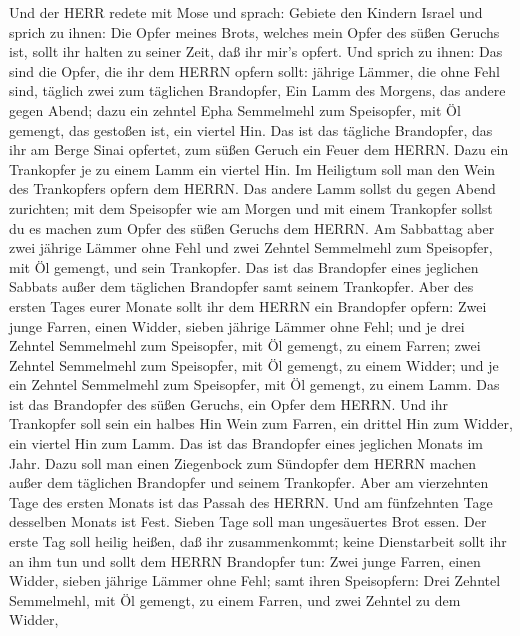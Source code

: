  Und der HERR redete mit Mose und sprach: 
Gebiete den Kindern Israel und sprich zu ihnen: Die Opfer meines Brots,
welches mein Opfer des süßen Geruchs ist, sollt ihr halten zu seiner
Zeit, daß ihr mir's opfert.  Und sprich zu ihnen: Das sind
die Opfer, die ihr dem HERRN opfern sollt: jährige Lämmer, die ohne Fehl
sind, täglich zwei zum täglichen Brandopfer,  Ein Lamm des
Morgens, das andere gegen Abend;  dazu ein zehntel Epha
Semmelmehl zum Speisopfer, mit Öl gemengt, das gestoßen ist, ein viertel
Hin.  Das ist das tägliche Brandopfer, das ihr am Berge
Sinai opfertet, zum süßen Geruch ein Feuer dem HERRN.  Dazu
ein Trankopfer je zu einem Lamm ein viertel Hin. Im Heiligtum soll man
den Wein des Trankopfers opfern dem HERRN.  Das andere Lamm
sollst du gegen Abend zurichten; mit dem Speisopfer wie am Morgen und
mit einem Trankopfer sollst du es machen zum Opfer des süßen Geruchs dem
HERRN.  Am Sabbattag aber zwei jährige Lämmer ohne Fehl und
zwei Zehntel Semmelmehl zum Speisopfer, mit Öl gemengt, und sein
Trankopfer.  Das ist das Brandopfer eines jeglichen Sabbats
außer dem täglichen Brandopfer samt seinem Trankopfer. 
Aber des ersten Tages eurer Monate sollt ihr dem HERRN ein Brandopfer
opfern: Zwei junge Farren, einen Widder, sieben jährige Lämmer ohne
Fehl;  und je drei Zehntel Semmelmehl zum Speisopfer, mit
Öl gemengt, zu einem Farren; zwei Zehntel Semmelmehl zum Speisopfer, mit
Öl gemengt, zu einem Widder;  und je ein Zehntel Semmelmehl
zum Speisopfer, mit Öl gemengt, zu einem Lamm. Das ist das Brandopfer
des süßen Geruchs, ein Opfer dem HERRN.  Und ihr Trankopfer
soll sein ein halbes Hin Wein zum Farren, ein drittel Hin zum Widder,
ein viertel Hin zum Lamm. Das ist das Brandopfer eines jeglichen Monats
im Jahr.  Dazu soll man einen Ziegenbock zum Sündopfer dem
HERRN machen außer dem täglichen Brandopfer und seinem Trankopfer.
 Aber am vierzehnten Tage des ersten Monats ist das Passah
des HERRN.  Und am fünfzehnten Tage desselben Monats ist
Fest. Sieben Tage soll man ungesäuertes Brot essen.  Der
erste Tag soll heilig heißen, daß ihr zusammenkommt; keine Dienstarbeit
sollt ihr an ihm tun  und sollt dem HERRN Brandopfer tun:
Zwei junge Farren, einen Widder, sieben jährige Lämmer ohne Fehl;
 samt ihren Speisopfern: Drei Zehntel Semmelmehl, mit Öl
gemengt, zu einem Farren, und zwei Zehntel zu dem Widder, 
